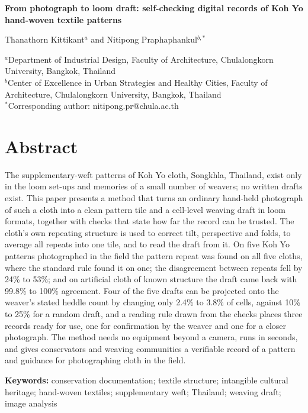 \documentclass[12pt]{article}
\begin{document}
\onehalfspacing
\begin{center}
{\LARGE\bfseries From photograph to loom draft: self-checking digital records of Koh Yo hand-woven textile patterns\par}
\vspace{1em}
{\large Thanathorn Kittikant$^{a}$ and Nitipong Praphaphankul$^{b,*}$\par}
\vspace{0.6em}
{\small $^{a}$Department of Industrial Design, Faculty of Architecture, Chulalongkorn University, Bangkok, Thailand\\
$^{b}$Center of Excellence in Urban Strategies and Healthy Cities, Faculty of Architecture, Chulalongkorn University, Bangkok, Thailand\\
$^{*}$Corresponding author: nitipong.pr@chula.ac.th\par}
\end{center}
\vspace{0.5em}
\linenumbers
\section{Abstract}
The supplementary-weft patterns of Koh Yo cloth, Songkhla, Thailand, exist only in the loom set-ups and memories of a small number of weavers; no written drafts exist. This paper presents a method that turns an ordinary hand-held photograph of such a cloth into a clean pattern tile and a cell-level weaving draft in loom formats, together with checks that state how far the record can be trusted. The cloth's own repeating structure is used to correct tilt, perspective and folds, to average all repeats into one tile, and to read the draft from it. On five Koh Yo patterns photographed in the field the pattern repeat was found on all five cloths, where the standard rule found it on one; the disagreement between repeats fell by 24\% to 53\%; and on artificial cloth of known structure the draft came back with 99.8\% to 100\% agreement. Four of the five drafts can be projected onto the weaver's stated heddle count by changing only 2.4\% to 3.8\% of cells, against 10\% to 25\% for a random draft, and a reading rule drawn from the checks places three records ready for use, one for confirmation by the weaver and one for a closer photograph. The method needs no equipment beyond a camera, runs in seconds, and gives conservators and weaving communities a verifiable record of a pattern and guidance for photographing cloth in the field.

\noindent\textbf{Keywords:} conservation documentation; textile structure; intangible cultural heritage; hand-woven textiles; supplementary weft; Thailand; weaving draft; image analysis
\end{document}
